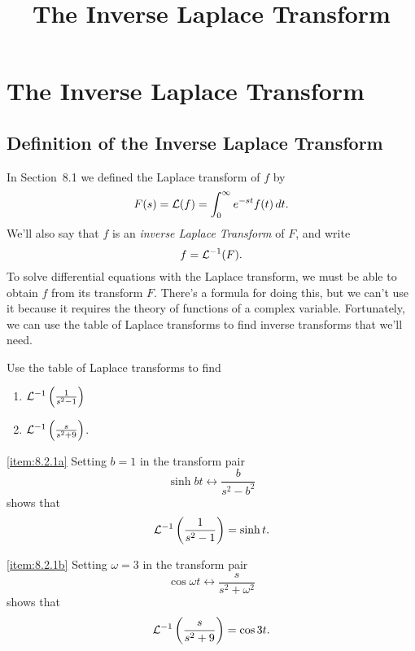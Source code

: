 \documentclass{ximera}
\title{The Inverse Laplace Transform}%
\begin{document}
\begin{abstract}

\end{abstract}

\maketitle

\section*{The Inverse Laplace Transform}

\subsection*{Definition of the Inverse Laplace Transform}

In Section~8.1 we defined the Laplace transform
of
$f$ by
$$
F(s)={\cal L}(f)=\int_0^\infty e^{-st}f(t)\,dt.
$$
We'll also say that $f$ is an \textit{inverse Laplace Transform} of
$F$, and write
$$
f={\cal L}^{-1}(F).
$$
To solve differential equations with the Laplace transform, we
must be able to obtain $f$ from its transform $F$. There's a formula
for doing this, but we can't use it because it requires the theory of
functions of a complex variable. Fortunately, we can use the table of
Laplace transforms to find inverse transforms that we'll need.

\begin{example}\label{example:8.2.1}
Use the table of Laplace transforms to find
\begin{enumerate}
    
    \item\label{item:8.2.1a} ${\cal L}^{-1}\left(\frac{1}{s^2-1}\right)$
    \item\label{item:8.2.1b} ${\cal L}^{-1}\left(\frac{s}{s^2+9}\right)$. 
\end{enumerate}
\begin{explanation}
\ref{item:8.2.1a}
Setting $b=1$ in  the transform pair
$$
\sinh bt\leftrightarrow \frac{b}{s^2-b^2}
$$
shows that
$$
{\cal L}^{-1}\left(\frac{1}{s^2-1}\right)=\sinh t.
$$

\ref{item:8.2.1b}
Setting $\omega=3$ in  the transform pair
$$
\cos\omega t\leftrightarrow\frac{s}{s^2+\omega^2}
$$
shows that
$$
{\cal L}^{-1}\left(\frac{s}{s^2+9}\right)=\cos3t.
$$
\end{explanation}
\end{example}
\end{document}
